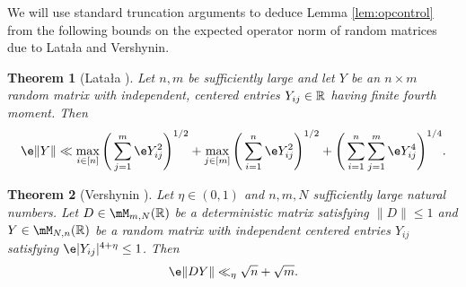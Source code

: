 \documentclass[aop,preprint]{imsart}
\theoremstyle{plain}
\newtheorem{theorem}{Theorem}[section]
\theoremstyle{definition}
\theoremstyle{remark}
\numberwithin{equation}{section}
\numberwithin{theorem}{section}
\begin{document}
We will use standard truncation arguments to deduce Lemma \ref{lem:opcontrol} from the following bounds on the expected operator norm of random matrices due to Lata\l a and Vershynin.

\begin{theorem}[Lata\l a \citep{Latala}]	\label{thm:latala}
Let $n,m$ be sufficiently large and let $Y$ be an $n\times m$ random matrix with independent, centered entries $Y_{ij}\in {\mathbb R}$ having finite fourth moment. Then
\begin{equation}
\e \|Y\| \ll \max_{i\in [n]} \Bigg( \sum_{j=1}^m \e Y_{ij}^2 \Bigg)^{1/2} + \max_{j\in [m]} \Bigg(\sum_{i=1}^n \e Y_{ij}^2 \Bigg)^{1/2} + \Bigg( \sum_{i=1}^n\sum_{j=1}^m \e Y_{ij}^4\Bigg)^{1/4}.
\end{equation}

\end{theorem}

\begin{theorem}[Vershynin \citep{Vershynin:product}]	\label{thm:vershynin}
Let $\eta\in (0,1)$ and $n,m,N$ sufficiently large natural numbers.
Let $D\in \mM_{m,N}(\R)$ be a deterministic matrix satisfying $\|D\|\le 1$ and $Y\in \mM_{N,n}(\R)$ be a random matrix with independent centered entries $Y_{ij}$ satisfying $\e |Y_{ij}|^{4+\eta}\le 1$.
Then
\begin{equation}
\e \|DY\| \ll_\eta \sqrt{n} + \sqrt{m}.
\end{equation}
\end{theorem}
\end{document}
